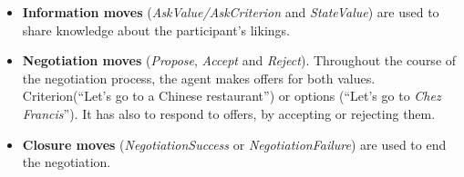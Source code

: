 \documentclass[runningheads,a4paper]{llncs}
\begin{document}
	\begin{itemize}
		\item \textbf{Information moves }(\textit{AskValue/AskCriterion} and \textit{StateValue}) are used to share knowledge about the participant's likings.
		\item \textbf{Negotiation moves} (\textit{Propose}, \textit{Accept} and \textit{Reject}). Throughout the course of the negotiation process, the agent makes offers for both values. Criterion(``Let's go to a Chinese restaurant'') or options (``Let's go to \emph{Chez Francis}''). It has also to respond to offers, by accepting or rejecting them.
		
		\item \textbf{Closure moves} (\textit{NegotiationSuccess} or \textit{NegotiationFailure}) are used to end the negotiation.
	\end{itemize}
	
	
	
\end{document}
